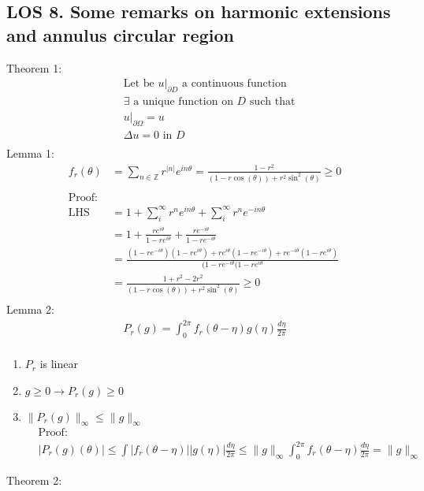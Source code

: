 \documentclass[12pt, a4paper]{article}
\begin{document}
\subsection*{LOS 8. Some remarks on harmonic extensions and annulus circular region}
Theorem 1:
\begin{align*}
    &\text{Let be $\left.u\right\rvert_{\partial D}$ a continuous function}\\ 
    &\exists \text{ a unique function on $D$ such that}\\
    &\left.u\right\rvert_{\partial \Omega} = u\\
    &\Delta u = 0 \text{ in } D\\
\end{align*}
Lemma 1:
\begin{align*}
    f_r(\theta) &= \sum_{n\in\mathbb{Z}}r^{|n|}e^{in\theta} = \frac{1-r^2}{(1-r\cos(\theta)) + r^2\sin^2(\theta)} \geq 0\\\\
    \text{Proof:}\\
    \text{LHS}&=1+\sum_i^\infty r^ne^{in\theta}+\sum_i^\infty r^ne^{-in\theta}\\
    &=1+\frac{re^{i\theta}}{1-re^{i\theta}}+\frac{re^{-i\theta}}{1-re^{-i\theta}}\\
    &=\frac{(1-re^{-i\theta})(1-re^{i\theta})+re^{i\theta}(1-re^{-i\theta})+re^{-i\theta}(1-re^{i\theta})}{(1-re^{-i\theta}(1-re^{i\theta}}\\
    &=\frac{1+r^2-2r^2}{(1-r\cos(\theta)) + r^2\sin^2(\theta)}\geq 0\\
\end{align*}
Lemma 2:
\begin{align*}
    P_r(g) = \int_0^{2\pi} f_r(\theta - \eta)g(\eta)\frac{d\eta}{2\pi}\\
\end{align*}
\begin{enumerate}
    \item $P_r$ is linear
    \item $g \geq 0 \rightarrow P_r(g)\geq 0$
    \item $\|P_r(g)\|_\infty \leq \|g\|_\infty$
    \begin{align*}
        &\text{Proof:}\\
        &|P_r(g)(\theta)| \leq \int|f_r(\theta - \eta)||g(\eta)|\frac{d\eta}{2\pi} \leq \|g\|_\infty\int_0^{2\pi}f_r(\theta - \eta)\frac{d\eta}{2\pi} = \|g\|_\infty
    \end{align*}
\end{enumerate}
Theorem 2:
\end{document}
